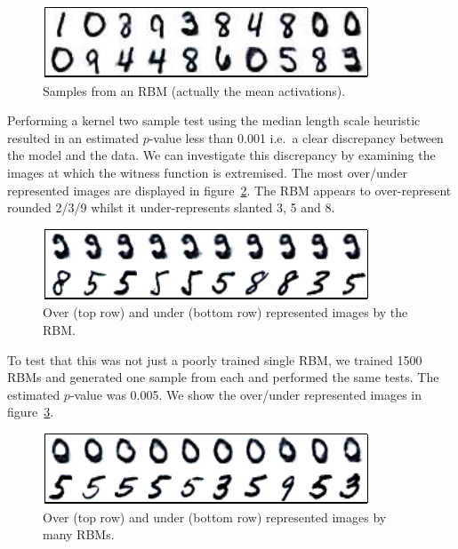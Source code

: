 \documentclass{article}
\def\ie{i.e.\ }
\begin{document}
\begin{figure}[ht]
\centering
\includegraphics[width=0.98\columnwidth]{figures/rbm_samples}
\caption{
Samples from an RBM (actually the mean activations).
}
\label{fig:rbm_samples}
\end{figure}

Performing a kernel two sample test using the median length scale heuristic resulted in an estimated $p$-value less than 0.001 \ie a clear discrepancy between the model and the data.
We can investigate this discrepancy by examining the images at which the witness function is extremised.
The most over/under represented images are displayed in figure~\ref{fig:rbm_over_under}.
The RBM appears to over-represent rounded 2/3/9 whilst it under-represents slanted 3, 5 and 8.

\begin{figure}[ht]
\centering
\includegraphics[width=0.98\columnwidth]{figures/rbm_over_under}
\caption{
Over (top row) and under (bottom row) represented images by the RBM.
}
\label{fig:rbm_over_under}
\end{figure}

To test that this was not just a poorly trained single RBM, we trained 1500 RBMs and generated one sample from each and performed the same tests.
The estimated $p$-value was 0.005.
We show the over/under represented images in figure~\ref{fig:many_rbm_over_under}.

\begin{figure}[ht]
\centering
\includegraphics[width=0.98\columnwidth]{figures/many_rbm_over_under}
\caption{
Over (top row) and under (bottom row) represented images by many RBMs.
}
\label{fig:many_rbm_over_under}
\end{figure}
\end{document}
